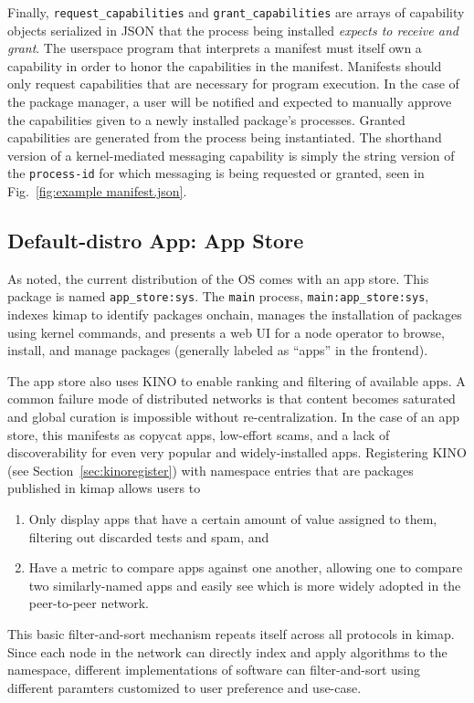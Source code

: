 \documentclass[runningheads]{llncs}
\begin{document}
Finally, \verb|request_capabilities| and \verb|grant_capabilities| are arrays of capability objects serialized in JSON that the process being installed \textit{expects to receive and grant}.
The userspace program that interprets a manifest must itself own a capability in order to honor the capabilities in the manifest.
Manifests should only request capabilities that are necessary for program execution.
In the case of the package manager, a user will be notified and expected to manually approve the capabilities given to a newly installed package's processes.
Granted capabilities are generated from the process being instantiated.
The shorthand version of a kernel-mediated messaging capability is simply the string version of the \verb|process-id| for which messaging is being requested or granted, seen in Fig.~\ref{fig:example manifest.json}.

\subsection{Default-distro App: App Store}
\label{sec:appstore}

As noted, the current distribution of the OS comes with an app store.
This package is named \verb|app_store:sys|.
The \verb|main| process, \verb|main:app_store:sys|, indexes kimap to identify packages onchain, manages the installation of packages using kernel commands, and presents a web UI for a node operator to browse, install, and manage packages (generally labeled as ``apps'' in the frontend).

The app store also uses KINO to enable ranking and filtering of available apps.
A common failure mode of distributed networks is that content becomes saturated and global curation is impossible without re-centralization.
In the case of an app store, this manifests as copycat apps, low-effort scams, and a lack of discoverability for even very popular and widely-installed apps.
Registering KINO (see Section~\ref{sec:kinoregister}) with namespace entries that are packages published in kimap allows users to
\begin{enumerate}
	\item Only display apps that have a certain amount of value assigned to them, filtering out discarded tests and spam, and
	\item Have a metric to compare apps against one another, allowing one to compare two similarly-named apps and easily see which is more widely adopted in the peer-to-peer network.
\end{enumerate}
This basic filter-and-sort mechanism repeats itself across all protocols in kimap.
Since each node in the network can directly index and apply algorithms to the namespace, different implementations of software can filter-and-sort using different paramters customized to user preference and use-case.
\end{document}
